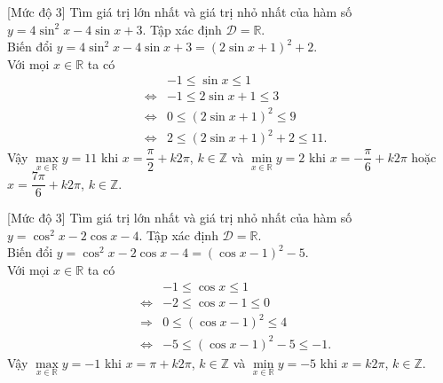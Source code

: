 \begin{bt}%
	[Mức độ 3]
	Tìm giá trị lớn nhất và giá trị nhỏ nhất của hàm số  $y=4 \sin^2 x-4 \sin x+3$.
	\loigiai
	{
		Tập xác định $\mathscr{D}=\mathbb{R}$.\\
		Biến đổi $y=4 \sin^2 x-4 \sin x+3=\left(2\sin x+1\right)^2+2$.\\
		Với mọi $x\in \mathbb{R}$ ta có
		\allowdisplaybreaks
		\begin{eqnarray*}
			& & -1\leq \sin x\leq 1\\
			&\Leftrightarrow& -1\leq 2\sin x+1\leq 3\\
			&\Leftrightarrow&0\leq \left( 2\sin x+1\right)^2\leq 9\\
			&\Leftrightarrow&2\leq \left( 2\sin x+1\right)^2+2\leq 11.
		\end{eqnarray*}
		Vậy $\max\limits_{x \in \mathbb{R}} y=11$ khi $x=\dfrac{\pi}{2}+k2\pi$, $k\in \mathbb{Z}$ và $\min\limits_{x \in \mathbb{R}} y=2$ khi $x=-\dfrac{\pi}{6}+k2\pi$ hoặc $x=\dfrac{7\pi}{6}+k2\pi$, $k\in \mathbb{Z}$.
	}
\end{bt}

\begin{bt}%
	[Mức độ 3]
	Tìm giá trị lớn nhất và giá trị nhỏ nhất của hàm số  $y=\cos^2 x-2 \cos x-4$.
	\loigiai
	{
		Tập xác định $\mathscr{D}=\mathbb{R}$.\\
		Biến đổi $y=\cos^2 x-2 \cos x-4=\left(\cos x-1\right)^2-5$.\\
		Với mọi $x\in \mathbb{R}$ ta có
		\allowdisplaybreaks
		\begin{eqnarray*}
			& & -1\leq \cos x\leq 1\\
			&\Leftrightarrow& -2\leq \cos x-1\leq 0\\
			&\Rightarrow&0\leq \left( \cos x-1\right)^2\leq 4\\
			&\Leftrightarrow&-5\leq \left( \cos x-1\right)^2-5\leq -1.
		\end{eqnarray*}
		Vậy $\max\limits_{x \in \mathbb{R}} y=-1$ khi $x=\pi+k2\pi$, $k\in \mathbb{Z}$ và $\min\limits_{x \in \mathbb{R}} y=-5$ khi $x=k2\pi$, $k\in \mathbb{Z}$.
	}
\end{bt}

